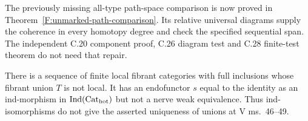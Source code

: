 The previously missing all-type path-space comparison is now proved
in Theorem~\ref{F:unmarked-path-comparison}. Its relative universal
diagrams supply the coherence in every homotopy degree and check the
specified sequential span. The independent C.20 component proof,
C.26 diagram test and C.28 finite-test theorem do not need that repair.

\begin{proposition}
\label{F:C28-union-counterexample}
There is a sequence of finite local fibrant categories with full
inclusions whose fibrant union $T$ is not local. It has an endofunctor
$s$ equal to the identity as an ind-morphism in
$\operatorname{Ind}(\mathrm {Cat}_{\mathrm{hot}})$ but not a nerve weak
equivalence. Thus ind-isomorphisms do not give the asserted uniqueness
of unions at V ms.~46--49.
\end{proposition}
